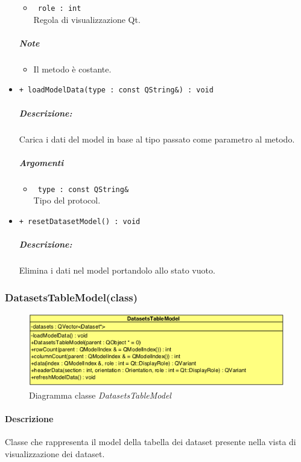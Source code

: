 \begin{itemize}
\begin{itemize}
			\item \color{RoyalPurple}\verb! role : int!\\
			\color{black}Regola di visualizzazione Qt\g{}.
		\end{itemize}
	\subparagraph{Note}
			\begin{itemize}
				\item Il metodo è costante.
			\end{itemize}
		
	\item \color{blue}\verb!+ loadModelData(type : const QString&) : void!\\
		\color{black}
		\subparagraph{Descrizione:} Carica i dati del model in base al tipo passato come parametro al metodo.\\
		\subparagraph{Argomenti}
			\begin{itemize}				
				\item \color{RoyalPurple}\verb! type : const QString&!\\
				\color{black} Tipo del protocol\g{}.
			\end{itemize}
			
	\item \color{blue}\verb!+ resetDatasetModel() : void!\\
		\color{black}
		\subparagraph{Descrizione:} Elimina i dati nel model portandolo allo stato vuoto.\\
\end{itemize}
\pagebreak


\subsubsection{DatasetsTableModel(class)}
\label{DatasetsTableModel}
\begin{figure}[!h]
	\centering
	\includegraphics[width=0.6\linewidth]{./Content/Immagini/QtModel/DatasetsTableModel.png}
	\caption{Diagramma classe \textsl{DatasetsTableModel}}
	\label{comp_DatasetsTableModel}
\end{figure}

\paragraph{Descrizione\\} 
Classe che rappresenta il model della tabella dei dataset\g{} presente nella vista di visualizzazione dei dataset\g{}.

